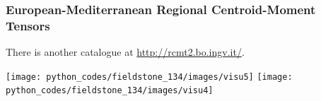 
\subsubsection*{European-Mediterranean Regional Centroid-Moment Tensors}

There is another catalogue at \url{http://rcmt2.bo.ingv.it/}.

\begin{center}
\texttt{[image: python\_codes/fieldstone\_134/images/visu5]}
\texttt{[image: python\_codes/fieldstone\_134/images/visu4]}
\end{center}


